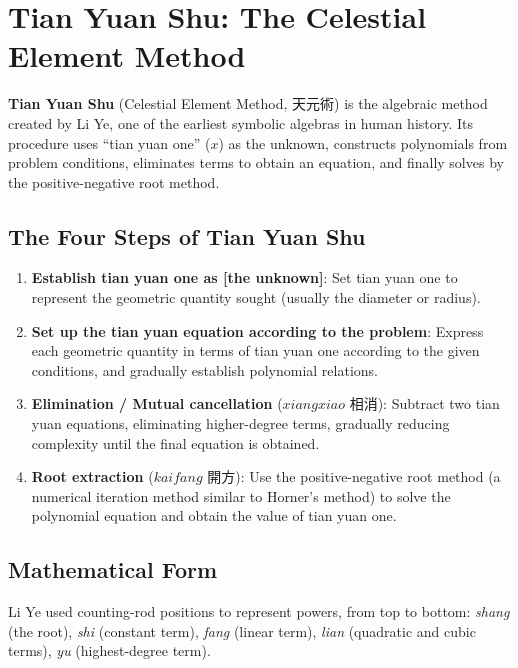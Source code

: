\documentclass[11pt,a4paper]{book}
\begin{document}
\newpage

\appendix

\chapter{Tian Yuan Shu: The Celestial Element Method}
\label{app:tianyuan}

\textbf{Tian Yuan Shu} (Celestial Element Method, 天元術) is the algebraic method created by Li Ye, one of the earliest symbolic algebras in human history. Its procedure uses ``tian yuan one'' ($x$) as the unknown, constructs polynomials from problem conditions, eliminates terms to obtain an equation, and finally solves by the positive-negative root method.

\section{The Four Steps of Tian Yuan Shu}

\begin{enumerate}[leftmargin=2em]
  \item \textbf{Establish tian yuan one as [the unknown]}: Set tian yuan one to represent the geometric quantity sought (usually the diameter or radius).

  \item \textbf{Set up the tian yuan equation according to the problem}: Express each geometric quantity in terms of tian yuan one according to the given conditions, and gradually establish polynomial relations.

  \item \textbf{Elimination / Mutual cancellation} ($xiang xiao$ 相消): Subtract two tian yuan equations, eliminating higher-degree terms, gradually reducing complexity until the final equation is obtained.

  \item \textbf{Root extraction} ($kai fang$ 開方): Use the positive-negative root method (a numerical iteration method similar to Horner's method) to solve the polynomial equation and obtain the value of tian yuan one.
\end{enumerate}

\section{Mathematical Form}

Li Ye used counting-rod positions to represent powers, from top to bottom: \textit{shang} (the root), \textit{shi} (constant term), \textit{fang} (linear term), \textit{lian} (quadratic and cubic terms), \textit{yu} (highest-degree term).
\end{document}
